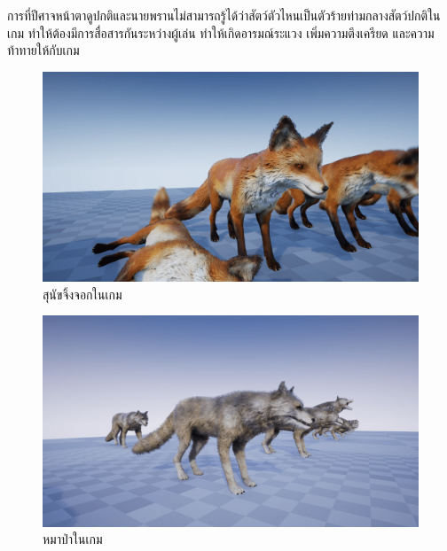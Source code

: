 การที่ปีศาจหน้าตาดูปกติและนายพรานไม่สามารถรู้ได้ว่าสัตว์ตัวไหนเป็นตัวร้ายท่ามกลางสัตว์ปกติในเกม ทำให้ต้องมีการสื่อสารกันระหว่างผู้เล่น ทำให้เกิดอารมณ์ระแวง เพิ่มความตึงเครียด และความท้าทายให้กับเกม

\begin{figure}[h]
  \begin{center}
  \includegraphics[width=\textwidth]{./img/fox.png}
  \end{center}
  \caption[สุนัขจิ้งจอกในเกม]{สุนัขจิ้งจอกในเกม}
  \label{fig:fox}
\end{figure}

\begin{figure}[h]
  \begin{center}
  \includegraphics[width=\textwidth]{./img/wolf.png}
  \end{center}
  \caption[หมาป่าในเกม]{หมาป่าในเกม}
  \label{fig:wolf}
\end{figure}

